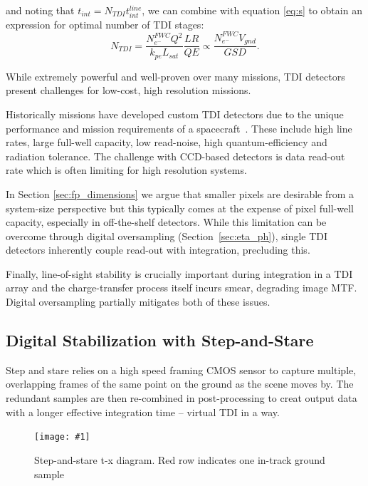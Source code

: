\documentclass[]{spieman}  %
\newcommand{\includefigure}[3]
{
  \begin{figure}[h!tb]
  \centering
  \texttt{[image: \#1]}
  \caption[]{#3}
  \label{#2}
  \end{figure}
}
\begin{document}
and noting that $t_{int} = N_{TDI}t_{int}^{line}$, we can combine with equation \eqref{eq:s} to obtain an expression for optimal number of TDI stages:
\begin{equation}
N_{TDI} =\frac{N_{e^-}^{FWC} Q^2}{k_{pe} L_{sat}}\frac{LR}{QE} \propto \frac{N_{e^-}^{FWC}V_{gnd}}{GSD}
\label{eq:n_tdi}.
\end{equation}


While extremely powerful and well-proven over many missions, TDI detectors present challenges for low-cost, high resolution missions.

Historically missions have developed custom TDI detectors due to the unique performance and mission requirements of a spacecraft~\cite{jerram}.  These include high line rates, large full-well capacity, low read-noise, high quantum-efficiency and radiation tolerance.  The challenge with CCD-based detectors is data read-out rate which is often limiting for high resolution systems.

In Section \ref{sec:fp_dimensions} we argue that smaller pixels are desirable from a system-size perspective but this typically comes at the expense of pixel full-well capacity, especially in off-the-shelf detectors.  
While  this limitation can be overcome through digital oversampling (Section~\ref{sec:eta_ph}), single TDI detectors inherently couple read-out with integration, precluding this. 

Finally, line-of-sight stability is crucially important during integration in a TDI array \cite{pittelkau} and the charge-transfer process itself incurs smear\cite{fiete_blur}, degrading image MTF.  Digital oversampling partially mitigates both of these issues.

\subsection{Digital Stabilization with Step-and-Stare}
Step and stare relies on a high speed framing CMOS sensor to capture multiple, overlapping frames of the same point on the ground as the scene moves by.  The redundant samples are then re-combined in post-processing to creat output data with a longer effective integration time -- virtual TDI in a way.

\includefigure{figures/step_stare.pgf}{fig:step_stare}{Step-and-stare t-x diagram.  Red row indicates one in-track ground sample}
\end{document}
